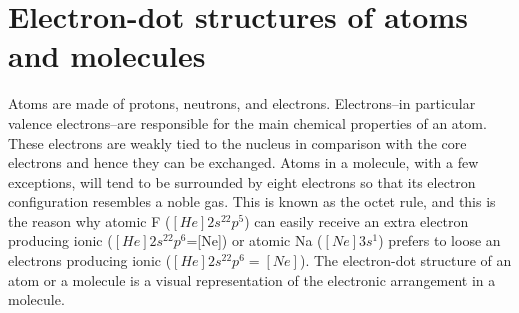 \documentclass[main.tex]{subfiles}
\begin{document}
\section{Electron-dot structures of atoms and molecules}
Atoms are made of protons, neutrons, and electrons. Electrons--in particular valence electrons--are responsible for the main chemical properties of an atom. These electrons are weakly tied to the nucleus in comparison with the core electrons and hence they can be exchanged. Atoms in a molecule, with a few exceptions, will tend to be surrounded by eight electrons so that its electron configuration resembles a noble gas. This is known as the octet rule, and this is the reason why atomic F ($[He]2s^22p^5$) can easily receive an extra electron producing ionic  ($[He]2s^22p^6$=[Ne]) or atomic Na ($[Ne]3s^1$) prefers to loose an electrons producing ionic  ($[He]2s^22p^6=[Ne]$). The electron-dot structure of an atom or a molecule is a visual representation of the electronic arrangement in a molecule. \sloppy 
	
	

	
	
\end{document}
